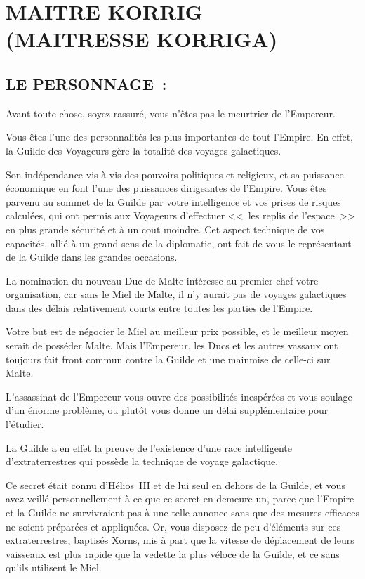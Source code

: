 \documentclass[14pt,twocolumn]{extarticle}
\begin{document}
\section{MAITRE KORRIG\\(MAITRESSE KORRIGA)}

\subsection{LE PERSONNAGE~:}

Avant toute chose, soyez rassuré, vous n'êtes pas le meurtrier de l'Empereur.

Vous êtes l'une des personnalités les plus importantes de tout l'Empire. En
effet, la Guilde des Voyageurs gère la totalité des voyages galactiques.

Son indépendance vis-à-vis des pouvoirs politiques et religieux, et sa
puissance économique en font l'une des puissances dirigeantes de l'Empire. Vous
êtes parvenu au sommet de la Guilde par votre intelligence et vos prises de
risques calculées, qui ont permis aux Voyageurs d'effectuer <<~les replis de
l'espace~>> en plus grande sécurité et à un cout moindre. Cet aspect technique
de vos capacités, allié à un grand sens de la diplomatie, ont fait de vous le
représentant de la Guilde dans les grandes occasions.

La nomination du nouveau Duc de Malte intéresse au premier chef votre
organisation, car sans le Miel de Malte, il n'y aurait pas de voyages
galactiques dans des délais relativement courts entre toutes les parties de
l'Empire.

Votre but est de négocier le Miel au meilleur prix possible, et le meilleur
moyen serait de posséder Malte. Mais l'Empereur, les Ducs et les autres vassaux
ont toujours fait front commun contre la Guilde et une mainmise de celle-ci
sur Malte.

L'assassinat de l'Empereur vous ouvre des possibilités inespérées et vous
soulage d'un énorme problème, ou plutôt vous donne un délai supplémentaire pour
l'étudier.

La Guilde a en effet la preuve de l'existence d'une race intelligente
d'extraterrestres qui possède la technique de voyage galactique.

Ce secret était connu d'Hélios~III et de lui seul en dehors de la Guilde, et
vous avez veillé personnellement à ce que ce secret en demeure un, parce que
l'Empire et la Guilde ne survivraient pas à une telle annonce sans que des
mesures efficaces ne soient préparées et appliquées. Or, vous disposez de peu
d'éléments sur ces extraterrestres, baptisés Xorns, mis à part que la vitesse
de déplacement de leurs vaisseaux est plus rapide que la vedette la plus véloce
de la Guilde, et ce sans qu'ils utilisent le Miel.
\end{document}
